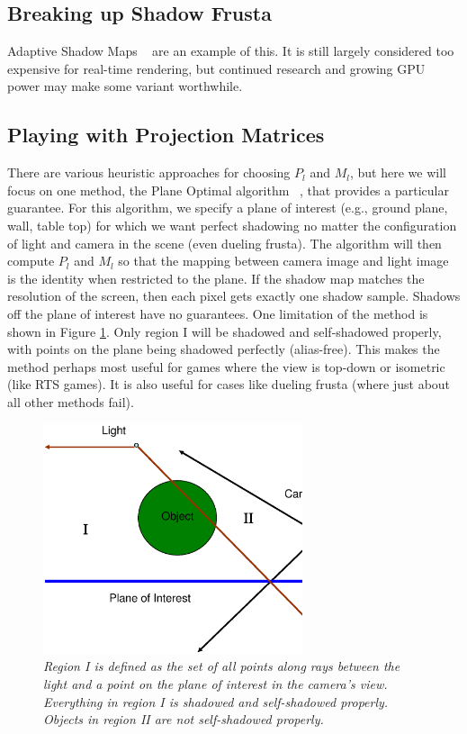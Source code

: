 \documentclass[]{article}  %
\begin{document}
\subsection{Breaking up Shadow Frusta}

Adaptive Shadow Maps ~\cite{FFB01} are an example of this.  It is still largely considered too expensive for real-time rendering, but continued research and growing GPU power may make some variant worthwhile.  

\subsection{Playing with Projection Matrices}
\label{sect:planeopt}
There are various heuristic approaches for choosing $P_l$ and $M_l$, but here we will focus on one method, the Plane Optimal algorithm ~\cite{Chong04}, that provides a particular guarantee.  For this algorithm, we specify a plane of interest (e.g., ground plane, wall, table top) for which we want perfect shadowing no matter the configuration of light and camera in the scene (even dueling frusta).  The algorithm will then compute $P_l$ and $M_l$ so that the mapping between camera image and light image is the identity when restricted to the plane.  If the shadow map matches the resolution of the screen, then each pixel gets exactly one shadow sample.  Shadows off the plane of interest have no guarantees.  
One limitation of the method is shown in Figure \ref{fig:planeopt}.  Only region I will be shadowed and self-shadowed properly, with points on the plane being shadowed perfectly (alias-free).  This makes the method perhaps most useful for games where the view is top-down or isometric (like RTS games).  It is also useful for cases like dueling frusta (where just about all other methods fail).  

\begin{figure}
	\centering
	  \vspace{-0.8in}
	  \hspace{-0.8in}
		\includegraphics[width=3in]{figure/optfrust.eps}
	\vspace{-1in}
	\caption{\em \small Region I is defined as the set of all points along rays between the light and a point on the plane of interest in the camera's view.  Everything in region I is shadowed and self-shadowed properly.  Objects in region II are not self-shadowed properly.}
	\label{fig:planeopt}
\end{figure}
\end{document}
